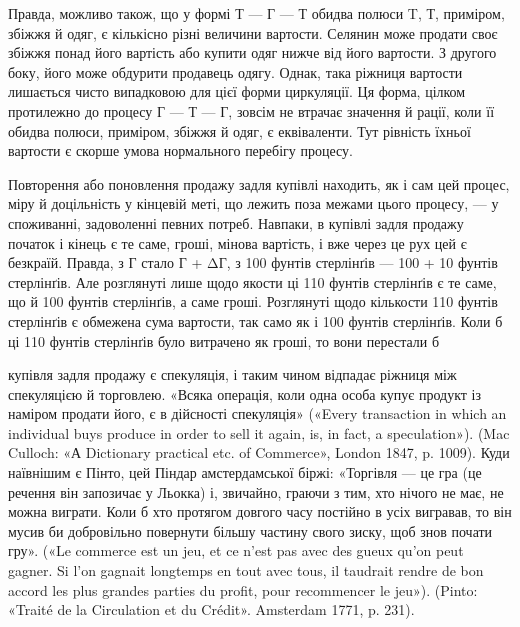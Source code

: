 Правда, можливо також, що у формі Т — Г — Т обидва полюси
T, Т, приміром, збіжжя й одяг, є кількісно різні величини
вартости. Селянин може продати своє збіжжя понад його вартість
або купити одяг нижче від його вартости. З другого боку, його
може обдурити продавець одягу. Однак, така ріжниця вартости
лишається чисто випадковою для цієї форми циркуляції. Ця форма,
цілком протилежно до процесу Г — Т — Г, зовсім не втрачає
значення й рації, коли її обидва полюси, приміром, збіжжя й
одяг, є еквіваленти. Тут рівність їхньої вартости є скорше умова
нормального перебігу процесу.

Повторення або поновлення продажу задля купівлі находить,
як і сам цей процес, міру й доцільність у кінцевій меті, що лежить
поза межами цього процесу, — у споживанні, задоволенні певних
потреб. Навпаки, в купівлі задля продажу початок і кінець
є те саме, гроші, мінова вартість, і вже через це рух цей є безкраїй.
Правда, з Г стало Г + ΔГ, з 100 фунтів стерлінґів — 100 + 10 фунтів
стерлінґів. Але розглянуті лише щодо якости ці 110 фунтів
стерлінґів є те саме, що й 100 фунтів стерлінґів, а саме гроші.
Розглянуті щодо кількости 110 фунтів стерлінґів є обмежена сума
вартости, так само як і 100 фунтів стерлінґів. Коли б ці 110 фунтів
стерлінґів було витрачено як гроші, то вони перестали б

купівля задля продажу є спекуляція, і таким чином відпадає ріжниця
між спекуляцією й торговлею. «Всяка операція, коли одна особа купує
продукт із наміром продати його, є в дійсності спекуляція» («Every
transaction in which an individual buys produce in order to sell it again,
is, in fact, a speculation»). (Mac Culloch: «А Dictionary practical etc.
of Commerce», London 1847, p. 1009). Куди наївнішим є Пінто, цей Піндар
амстердамської біржі: «Торгівля — це гра (це речення він запозичає
у Льокка) і, звичайно, граючи з тим, хто нічого не має, не можна
виграти. Коли б хто протягом довгого часу постійно в усіх вигравав,
то він мусив би добровільно повернути більшу частину свого зиску,
щоб знов почати гру». («Le commerce est un jeu, et ce n’est pas avec des
gueux qu’on peut gagner. Si l’on gagnait longtemps en tout avec tous, il
taudrait rendre de bon accord les plus grandes parties du profit, pour
recommencer le jeu»). (Pinto: «Traité de la Circulation et du Crédit».
Amsterdam 1771, p. 231).
\parbreak{}  %
